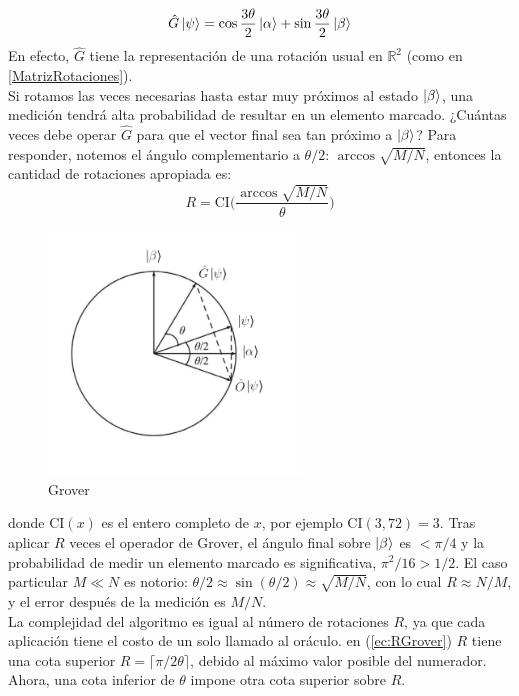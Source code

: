 \begin{appendix}
\begin{equation}
    \hat{G}\ket{\psi}=\cos\frac{3\theta}{2}\ket{\alpha}+\sin\frac{3\theta}{2}\ket{\beta}
\end{equation}
En efecto, $\hat{G}$ tiene la representación de una rotación usual en $\mathbb{R}^2$ (como en \ref{MatrizRotaciones}).\\
Si rotamos las veces necesarias hasta estar muy próximos al estado $\ket{\beta}$, una medición tendrá alta probabilidad de resultar en un elemento marcado.
¿Cuántas veces debe operar $\hat{G}$ para que el vector final sea tan próximo a $\ket{\beta}$? Para responder, notemos el ángulo complementario a $\theta/2$: $\arccos\sqrt{M/N}$, entonces la cantidad de rotaciones apropiada es:
\begin{equation}
    R=\text{CI}\big( \dfrac{\arccos\sqrt{M/N}}{\theta}\big)
    \label{ec:RGrover}
\end{equation}

\begin{figure}[ht]
\centering
\includegraphics[width=0.6\textwidth]{Anexos/grover.png}
\caption{Grover}
\label{gr:Grover}
\end{figure}
donde $\text{CI}(x)$ es el entero completo de $x$, por ejemplo $\text{CI}(3,72)=3$. Tras aplicar $R$ veces el operador de Grover, el ángulo final sobre $\ket{\beta}$ es $<\pi/4$ y la probabilidad de medir un elemento marcado es significativa, $\pi^2/16>1/2$. El caso particular $M\ll N$ es notorio: $\theta/2\approx \sin(\theta/2)\approx \sqrt{M/N}$, con lo cual $R\approx N/M$, y el error después de la medición es $M/N$. \\
La complejidad del algoritmo es igual al número de rotaciones $R$, ya que cada aplicación tiene el costo de un solo llamado al oráculo. en (\ref{ec:RGrover}) $R$ tiene una cota superior $R=\lceil\pi/2\theta \rceil$, debido al máximo valor posible del numerador. Ahora, una cota inferior de $\theta$ impone otra cota superior sobre $R$.


\end{appendix}
